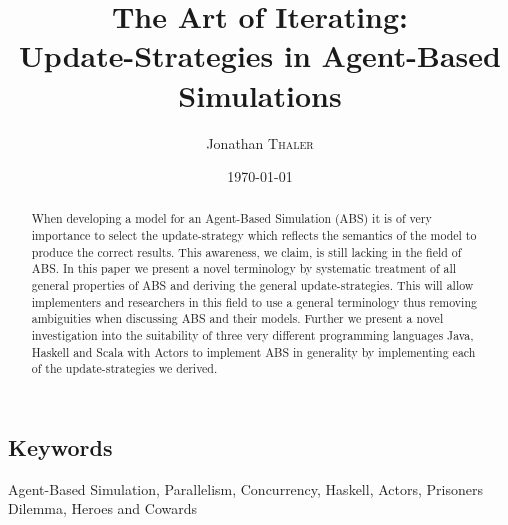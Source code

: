 \documentclass[twocolumn]{article}
\title{The Art of Iterating:\\Update-Strategies in Agent-Based Simulations} %
\author{Jonathan \textsc{Thaler}} %
\date{\today} %
\begin{document}
%
\maketitle %

\begin{abstract}
When developing a model for an Agent-Based Simulation (ABS) it is of very importance to select the update-strategy which reflects the semantics of the model to produce the correct results. This awareness, we claim, is still lacking in the field of ABS. In this paper we present a novel terminology by systematic treatment of all general properties of ABS and deriving the general update-strategies. This will allow implementers and researchers in this field to use a general terminology thus removing ambiguities when discussing ABS and their models. Further we present a novel investigation into the suitability of three very different programming languages Java, Haskell and Scala with Actors to implement ABS in generality by implementing each of the update-strategies we derived.
\end{abstract}

\subsection*{Keywords}
Agent-Based Simulation, Parallelism, Concurrency, Haskell, Actors, Prisoners Dilemma, Heroes and Cowards















\newpage



\end{document}
